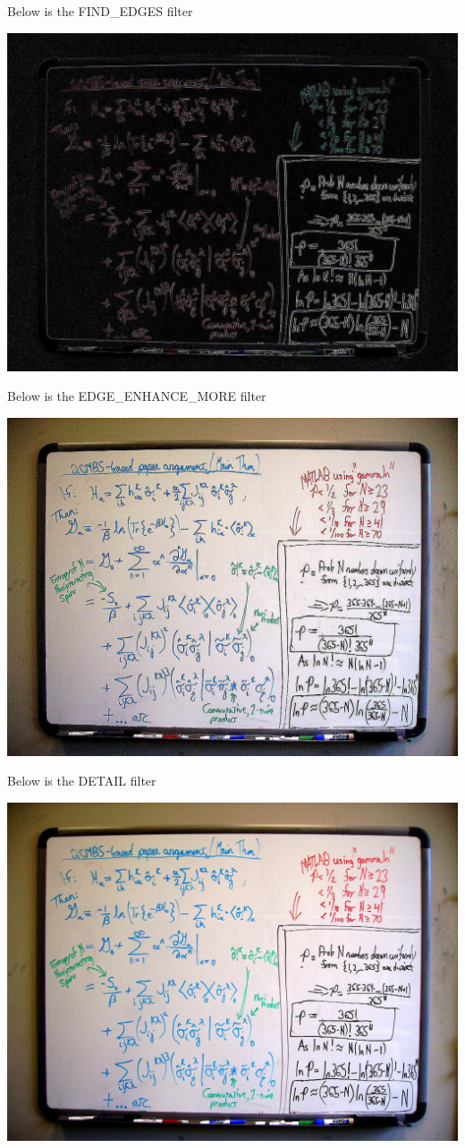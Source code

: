 \documentclass[]{article}
\begin{document}
			Below is the FIND\_EDGES filter
			
			\includegraphics[scale=0.238]{images/python-filters/find-edges.jpg}
			
			Below is the EDGE\_ENHANCE\_MORE filter
			
			\includegraphics[scale=0.238]{images/python-filters/edge_enhance_more.jpg}
		
			Below is the DETAIL filter
			
			\includegraphics[scale=0.238]{images/python-filters/detail.jpg}
		
\end{document}
